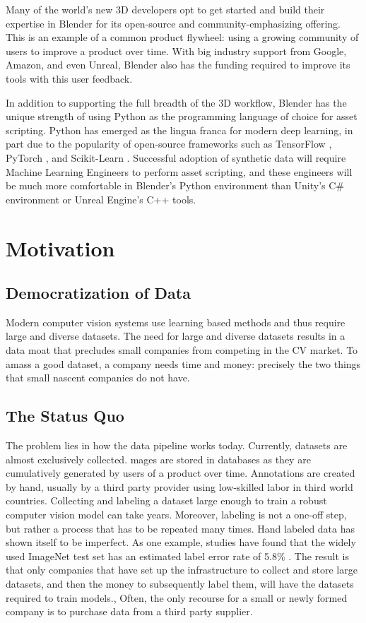 \documentclass{article}
\begin{document}
Many of the world’s new 3D developers opt to get started and build their expertise in Blender for its open-source and community-emphasizing offering. This is an example of a common product flywheel: using a growing community of users to improve a product over time. With big industry support from Google, Amazon, and even Unreal, Blender also has the funding required to improve its tools with this user feedback.

In addition to supporting the full breadth of the 3D workflow, Blender has the unique strength of using Python as the programming language of choice for asset scripting. Python has emerged as the lingua franca for modern deep learning, in part due to the popularity of open-source frameworks such as TensorFlow \cite{tensorflow}, PyTorch \cite{pytorch}, and Scikit-Learn \cite{scikit-learn}. Successful adoption of synthetic data will require Machine Learning Engineers to perform asset scripting, and these engineers will be much more comfortable in Blender’s Python environment than Unity's C\# environment or Unreal Engine’s C++ tools.

\section{Motivation}
\label{sec:motivation}

\subsection{Democratization of Data}
\label{sec:democratizationofdata}

Modern computer vision systems use learning based methods and thus require large and diverse datasets. The need for large and diverse datasets results in a data moat that precludes small companies from competing in the CV market. To amass a good dataset, a company needs time and money: precisely the two things that small nascent companies do not have. 

\subsection{The Status Quo}

The problem lies in how the data pipeline works today. Currently, datasets are almost exclusively collected. mages are stored in databases as they are cumulatively generated by users of a product over time. Annotations are created by hand, usually by a third party provider using low-skilled labor in third world countries. Collecting and labeling a dataset large enough to train a robust computer vision model can take years. Moreover, labeling is not a one-off step, but rather a process that has to be repeated many times. Hand labeled data has shown itself to be imperfect. As one example, studies have found that the widely used ImageNet test set has an estimated label error rate of 5.8\% \cite{dataerrors}. The result is that only companies that have set up the infrastructure to collect and store large datasets, and then the money to subsequently label them, will have the datasets required to train models., Often, the only recourse for a small or newly formed company is to  purchase data from a third party supplier. 
\end{document}
